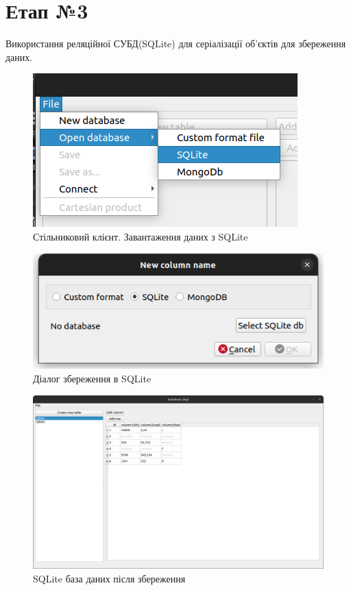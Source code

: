 \documentclass[a4paper, 12pt]{article}
\begin{document}
\section{Етап №3}
Використання реляційної СУБД(SQLite) для серіалізації об'єктів для збереження даних.
 
\begin{figure}[H]
\centering
\includegraphics[scale=0.8]{resources/SQLiteLoadMenu.png}
\caption{Стільниковий клієнт. Завантаження даних з SQLite}
\end{figure} 

\begin{figure}[H]
\centering
\includegraphics[scale=0.8]{resources/SQLiteSaveDialog.png}
\caption{Діалог збереження в SQLite}
\end{figure} 

\begin{figure}[H]
\centering
\includegraphics[scale=0.3]{resources/SQLite.png}
\caption{SQLite база даних після збереження}
\end{figure} 
 
\end{document}
